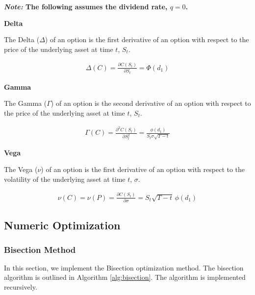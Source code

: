 \documentclass[10pt]{article}
\begin{document}
        \begin{center}
            \textbf{\textit{Note:} The following assumes the dividend rate, $q = 0$.}
        \end{center}
    
        \textbf{Delta}
    
        The Delta ($\Delta$) of an option is the first derivative of an option with respect to the price of the underlying asset at time $t$, $S_t$.
    
        \begin{gather*}
            \Delta(C) = \frac{\partial C(S_t)}{\partial S_t} = \Phi(d_1)
        \end{gather*}
    
        \textbf{Gamma}
    
        The Gamma ($\Gamma$) of an option is the second derivative of an option with respect to the price of the underlying asset at time $t$, $S_t$.

        \begin{gather*}
            \Gamma(C) = \frac{\partial^2 C(S_t)}{\partial S_t^2} = \frac{\phi(d_1)}{S_t \sigma \sqrt{T-t}}
        \end{gather*}
    
        \textbf{Vega}
    
        The Vega ($\nu$) of an option is the first derivative of an option with respect to the volatility of the underlying asset at time $t$, $\sigma$.
        
        \begin{gather*}
            \nu(C) = \nu(P) = \frac{\partial C(S_t)}{\partial \sigma} = S_t \sqrt{T-t} \, \phi(d_1)
        \end{gather*}
        
        

    \newpage
    \subsection{Numeric Optimization}

        \subsubsection{Bisection Method}

        In this section, we implement the Bisection optimization method. The bisection algorithm is outlined in Algorithm \ref{alg:bisection}. The algorithm is implemented recursively.
\end{document}

